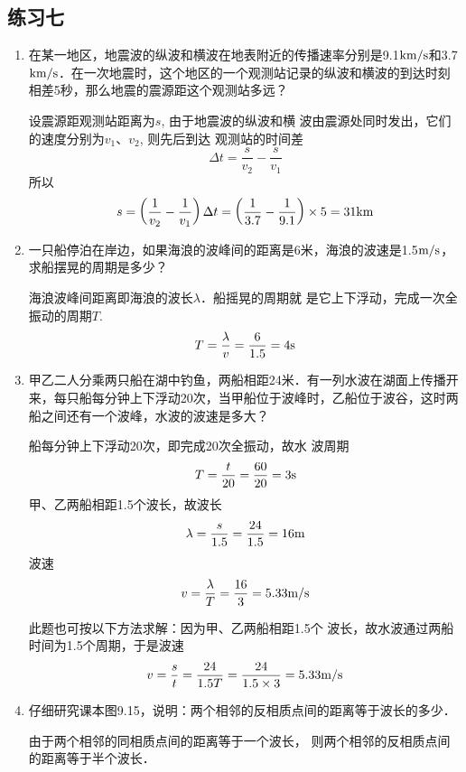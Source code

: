 \subsection{练习七}
\begin{enumerate}
    \item 在某一地区，地震波的纵波和横波在地表附近的传播速率分别是9.1${\rm km}/{\rm s}$和3.7${\rm km}/{\rm s}$．在一次地震时，这个地区的一个观测站记录的纵波和横波的到达时刻相差5秒，那么地震的震源距这个观测站多远？

    \begin{solution}
        设震源距观测站距离为$s$, 由于地震波的纵波和横
        波由震源处同时发出，它们的速度分别为$v_1$、$v_2$, 则先后到达
        观测站的时间差
        \[\Delta t=\frac{s}{v_2}-\frac{s}{v_1}\]
        所以
\[s=\left(\frac{1}{v_2}-\frac{1}{v_1}\right)\Delta t=\left(\frac{1}{3.7}-\frac{1}{9.1}\right)\times 5=31{\rm km}\]
    \end{solution}
    \item 一只船停泊在岸边，如果海浪的波峰间的距离是6米，海浪的波速是1.5$\text{m}/\text{s}$，求船摆晃的周期是多少？

    \begin{solution}
        海浪波峰间距离即海浪的波长$\lambda$．船摇晃的周期就
        是它上下浮动，完成一次全振动的周期$T$. 
        \[T=\frac{\lambda}{v}=\frac{6}{1.5}=4{\rm s}\]
    \end{solution}
    \item 甲乙二人分乘两只船在湖中钓鱼，两船相距24米．有一列水波在湖面上传播开来，每只船每分钟上下浮动20次，当甲船位于波峰时，乙船位于波谷，这时两船之间还有一个波峰，水波的波速是多大？

    \begin{solution}
        船每分钟上下浮动20次，即完成20次全振动，故水
        波周期
        \[T=\frac{t}{20}=\frac{60}{20}=3{\rm s}\]
        甲、乙两船相距1.5个波长，故波长
\[ \lambda=\frac{s}{1.5}=\frac{24}{1.5}=16{\rm m} \]
        波速
\[v=\frac{\lambda}{T}=\frac{16}{3}=5.33\text{m}/\text{s}\]

        此题也可按以下方法求解：因为甲、乙两船相距1.5个
        波长，故水波通过两船时间为1.5个周期，于是波速
        \[v=\frac{s}{t}=\frac{24}{1.5T}=\frac{24}{1.5\times 3}=5.33\text{m}/\text{s}\]
    \end{solution}
    \item 仔细研究课本图9.15，说明：两个相邻的反相质点间的距离等于波长的多少．

    \begin{solution}
        由于两个相邻的同相质点间的距离等于一个波长，
        则两个相邻的反相质点间的距离等于半个波长．
    \end{solution}
\end{enumerate}


